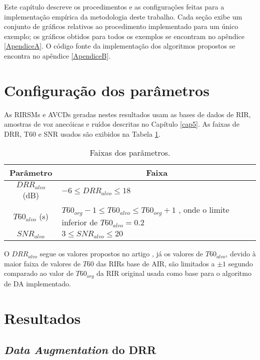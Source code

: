 Este capítulo descreve os procedimentos e as configurações feitas para a implementação empírica da metodologia deste trabalho.
Cada seção exibe um conjunto de gráficos relativos ao procedimento implementado para um único exemplo; os gráficos obtidos para todos
os exemplos se encontram no apêndice \ref{ApendiceA}.
O código fonte da implementação dos algoritmos propostos se encontra no apêndice \ref{ApendiceB}.

\section{Configuração dos parâmetros}

As RIRSMs e AVCDs geradas nestes resultados usam as bases de dados de RIR, amostras de voz anecóicas e ruídos descritas no Capítulo \ref{cap5}.
As faixas de DRR, T60 e SNR usados são exibidos na Tabela \ref{tbl:config-param}.

\begin{table} [H]
    \centering
    \caption{Faixas dos parâmetros.}
    \label{tbl:config-param}
    \begin{tabular}{c|p{9cm}}

        \multicolumn{1}{c|}{\textbf{Parâmetro}} & \multicolumn{1}{c}{\textbf{Faixa}} \\
        \hline 

        $DRR_{alvo}$ (dB) & $-6 \le DRR_{alvo} \le 18 $ \\
        $T60_{alvo}$ (s) & $T60_{org} - 1  \le T60_{alvo} \le T60_{org} + 1$ , onde o limite inferior de $T60_{alvo} = 0.2$ \\
        $SNR_{alvo}$ & $3 \le SNR_{alvo} \le 20 $ \\

    \end{tabular}
\end{table}

O $DRR_{alvo}$ segue os valores propostos no artigo \cite{RIR_Data_Aug}, já os valores de $T60_{alvo}$, devido à maior faixa de valores 
de $T60$ das RIRs base de AIR, são limitados a $\pm 1 $ segundo comparado ao valor de $T60_{org}$ da RIR original usada como base para o algoritmo
de DA implementado.

\section{Resultados}

\subsection{\textit{Data Augmentation} do DRR}

